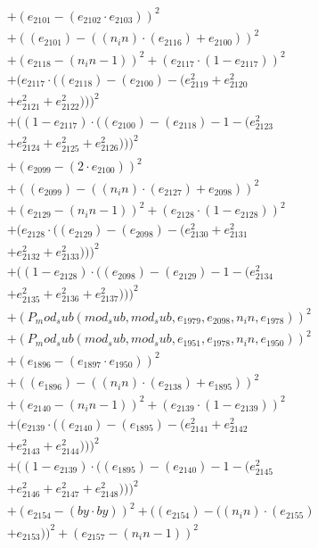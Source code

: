 \documentclass[10pt, a4paper]{article}
\begin{document}
\begin{small}
\begin{align*}
& + (e_{2101} - (e_{2102}  \cdot  e_{2103}))^{2} \\
& + ((e_{2101}) - ((n_in)  \cdot  (e_{2116}) + e_{2100}))^{2} \\
& + (e_{2118} - (n_in - 1))^{2} + (e_{2117}  \cdot  (1 - e_{2117}))^{2} \\
& + (e_{2117}  \cdot  ((e_{2118}) - (e_{2100}) - (e_{2119}^{2} + e_{2120}^{2} \\
& + e_{2121}^{2} + e_{2122}^{2})))^{2} \\
& + ((1 - e_{2117})  \cdot  ((e_{2100}) - (e_{2118}) - 1 - (e_{2123}^{2} \\
& + e_{2124}^{2} + e_{2125}^{2} + e_{2126}^{2})))^{2} \\
& + (e_{2099} - (2  \cdot  e_{2100}))^{2} \\
& + ((e_{2099}) - ((n_in)  \cdot  (e_{2127}) + e_{2098}))^{2} \\
& + (e_{2129} - (n_in - 1))^{2} + (e_{2128}  \cdot  (1 - e_{2128}))^{2} \\
& + (e_{2128}  \cdot  ((e_{2129}) - (e_{2098}) - (e_{2130}^{2} + e_{2131}^{2} \\
& + e_{2132}^{2} + e_{2133}^{2})))^{2} \\
& + ((1 - e_{2128})  \cdot  ((e_{2098}) - (e_{2129}) - 1 - (e_{2134}^{2} \\
& + e_{2135}^{2} + e_{2136}^{2} + e_{2137}^{2})))^{2} \\
& + (P_mod_sub(mod_sub, mod_sub, e_{1979}, e_{2098}, n_in, e_{1978}))^{2} \\
& + (P_mod_sub(mod_sub, mod_sub, e_{1951}, e_{1978}, n_in, e_{1950}))^{2} \\
& + (e_{1896} - (e_{1897}  \cdot  e_{1950}))^{2} \\
& + ((e_{1896}) - ((n_in)  \cdot  (e_{2138}) + e_{1895}))^{2} \\
& + (e_{2140} - (n_in - 1))^{2} + (e_{2139}  \cdot  (1 - e_{2139}))^{2} \\
& + (e_{2139}  \cdot  ((e_{2140}) - (e_{1895}) - (e_{2141}^{2} + e_{2142}^{2} \\
& + e_{2143}^{2} + e_{2144}^{2})))^{2} \\
& + ((1 - e_{2139})  \cdot  ((e_{1895}) - (e_{2140}) - 1 - (e_{2145}^{2} \\
& + e_{2146}^{2} + e_{2147}^{2} + e_{2148}^{2})))^{2} \\
& + (e_{2154} - (by  \cdot  by))^{2} + ((e_{2154}) - ((n_in)  \cdot  (e_{2155}) \\
& + e_{2153}))^{2} + (e_{2157} - (n_in - 1))^{2} \\

\end{align*}
\end{small}
\end{document}
